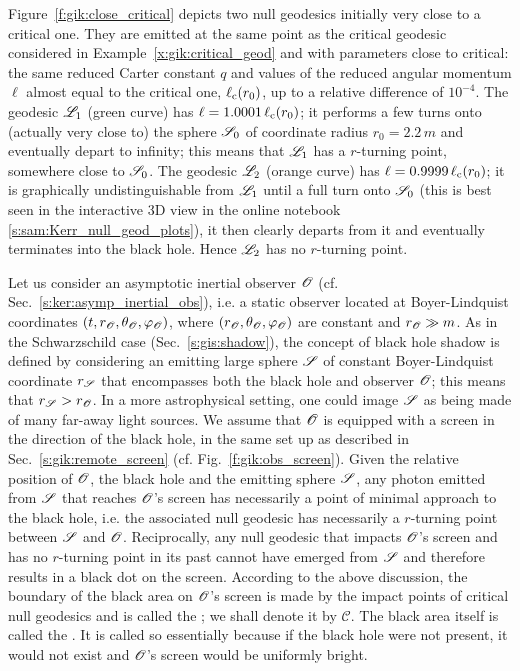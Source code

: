 \begin{example}
Figure~\ref{f:gik:close_critical} depicts
two null geodesics initially very close to a critical one.
They are emitted at the same point as the critical geodesic considered in Example~\ref{x:gik:critical_geod}
and with parameters close to critical: the same reduced Carter constant $q$
and values of the reduced angular momentum $\ell$ almost equal to the critical
one, $\ell_{\rm c}(r_0)$, up to a relative difference of $10^{-4}$.
The geodesic $\mathscr{L}_1$ (green curve) has $\ell = 1.0001\,\ell_{\rm c}(r_0)$; it performs a few
turns onto (actually very close to) the sphere $\mathscr{S}_0$ of coordinate radius $r_0 = 2.2\, m$ and eventually depart to infinity; this means that $\mathscr{L}_1$ has a $r$-turning point, somewhere close
to $\mathscr{S}_0$.
The geodesic $\mathscr{L}_2$ (orange curve) has $\ell = 0.9999\,\ell_{\rm c}(r_0)$; it is
graphically undistinguishable from $\mathscr{L}_1$ until a full turn onto $\mathscr{S}_0$
(this is best seen in the interactive 3D view in the online notebook \ref{s:sam:Kerr_null_geod_plots}),
it then clearly
departs from it and eventually terminates into the black hole. Hence $\mathscr{L}_2$ has no $r$-turning
point.
\end{example}

Let us consider an asymptotic inertial observer $\mathscr{O}$ (cf. Sec.~\ref{s:ker:asymp_inertial_obs}),
i.e. a static observer located at Boyer-Lindquist coordinates $(t,r_{\mathscr{O}},\theta_{\mathscr{O}},\varphi_{\mathscr{O}})$,
where $(r_{\mathscr{O}},\theta_{\mathscr{O}},\varphi_{\mathscr{O}})$ are constant and $r_{\mathscr{O}} \gg m$.
As in the Schwarzschild case (Sec.~\ref{s:gis:shadow}), the concept of
black hole shadow is defined by considering an emitting large sphere $\mathscr{S}$
of constant Boyer-Lindquist coordinate $r_{\mathscr{S}}$ that
encompasses both the black hole and observer $\mathscr{O}$; this means that
$r_{\mathscr{S}} > r_{\mathscr{O}}$. In a more astrophysical setting, one could image $\mathscr{S}$
as being made of many far-away light sources.
We assume that $\mathscr{O}$ is equipped with a screen in the
direction of the black hole, in the same set up as described in Sec.~\ref{s:gik:remote_screen}
(cf. Fig.~\ref{f:gik:obs_screen}). Given the relative position of $\mathscr{O}$, the black hole
and the emitting sphere $\mathscr{S}$, any photon emitted from $\mathscr{S}$ that reaches $\mathscr{O}$'s screen
has necessarily a point of minimal approach to the black hole, i.e. the associated
null geodesic has necessarily a $r$-turning point between $\mathscr{S}$ and $\mathscr{O}$.
Reciprocally, any null geodesic that impacts $\mathscr{O}$'s screen and has no
$r$-turning point in its past cannot have emerged from $\mathscr{S}$ and therefore
results in a black dot on the screen. According to the above discussion, the
boundary of the black area on $\mathscr{O}$'s screen is made by the impact points of
critical null geodesics and is called the 
\cite{GrallHW19,GrallL20a}; we shall denote it by $\mathscr{C}$.
The black area itself is called the
.
It is called so essentially because if the black hole were not present, it would
not exist and $\mathscr{O}$'s screen would be uniformly bright.


